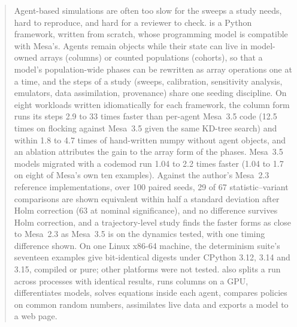 \begin{abstract}
Agent-based simulations are often too slow for the sweeps a study needs, hard to reproduce,
and hard for a reviewer to check. \modelly{} is a Python framework, written from
scratch, whose programming model is compatible with Mesa's. Agents remain objects while their
state can live in model-owned arrays (columns) or counted populations (cohorts), so that a
model's population-wide phases can be rewritten as array operations one at a time, and the
steps of a study (sweeps, calibration, sensitivity analysis, emulators, data assimilation,
provenance) share one seeding discipline. On eight workloads written idiomatically for each
framework, the column form runs its steps 2.9 to 33 times faster than per-agent Mesa~3.5 code
(12.5 times on flocking against Mesa~3.5 given the same KD-tree search) and within 1.8 to 4.7 times of hand-written numpy without agent objects, and an ablation
attributes the gain to the array form of the phases. Mesa~3.5 models migrated with a codemod
run 1.04 to 2.2 times faster (1.04 to 1.7 on eight of Mesa's own ten examples). Against the author's Mesa~2.3
reference implementations, over 100 paired seeds, 29 of 67 statistic--variant comparisons are
shown equivalent within half a standard deviation after Holm correction (63 at nominal
significance), and no difference survives Holm correction, and a trajectory-level study finds the faster forms as close to
Mesa~2.3 as Mesa~3.5 is on the dynamics tested, with one timing difference shown. On one Linux x86-64 machine,
the determinism suite's seventeen examples give bit-identical digests under CPython 3.12,
3.14 and 3.15, compiled or pure; other platforms were not tested. \modelly{}
also splits a run across processes with identical results, runs columns on a GPU,
differentiates models, solves equations inside each agent, compares policies on common
random numbers, assimilates live data and exports a model to a web page.
\end{abstract}

